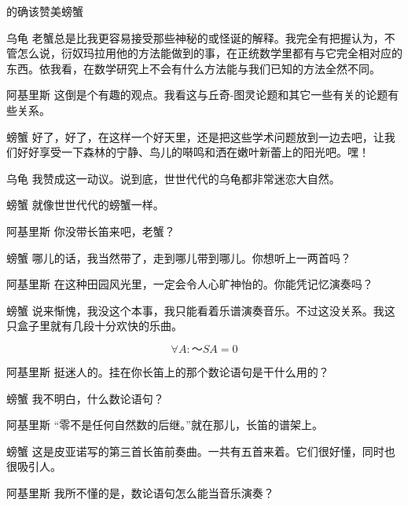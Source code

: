\begin{dialog}{的确该赞美螃蟹}
\begin{dialogue}
\item[乌龟]老蟹总是比我更容易接受那些神秘的或怪诞的解释。我完全有把握认为，不管怎么说，衍奴玛拉用他的方法能做到的事，在正统数学里都有与它完全相对应的东西。依我看，在数学研究上不会有什么方法能与我们已知的方法全然不同。

\item[阿基里斯]这倒是个有趣的观点。我看这与丘奇-图灵论题和其它一些有关的论题有些关系。

\item[螃蟹]好了，好了，在这样一个好天里，还是把这些学术问题放到一边去吧，让我们好好享受一下森林的宁静、鸟儿的啭鸣和洒在嫩叶新蕾上的阳光吧。嘿！

\item[乌龟]我赞成这一动议。说到底，世世代代的乌龟都非常迷恋大自然。

\item[螃蟹]就像世世代代的螃蟹一样。

\item[阿基里斯]你没带长笛来吧，老蟹？

\item[螃蟹]哪儿的话，我当然带了，走到哪儿带到哪儿。你想听上一两首吗？

\item[阿基里斯]在这种田园风光里，一定会令人心旷神怡的。你能凭记忆演奏吗？

\item[螃蟹]说来惭愧，我没这个本事，我只能看着乐谱演奏音乐。不过这没关系。我这只盒子里就有几段十分欢快的乐曲。

\[
\forall A:～SA=0
\]

\item[阿基里斯]挺迷人的。挂在你长笛上的那个数论语句是干什么用的？

\item[螃蟹]我不明白，什么数论语句？

\item[阿基里斯]“零不是任何自然数的后继。”就在那儿，长笛的谱架上。

\item[螃蟹]这是皮亚诺写的第三首长笛前奏曲。一共有五首来着。它们很好懂，同时也很吸引人。

\item[阿基里斯]我所不懂的是，数论语句怎么能当音乐演奏？


\end{dialogue}
\end{dialog}
